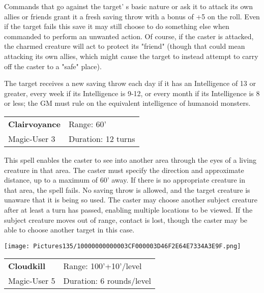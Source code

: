 \documentclass[a4paper,twoside,openany,10pt]{book}
\begin{document}
\begin{multicols}{2}
Commands that go against the target' s basic nature or ask it to attack its own allies or friends grant it a fresh saving throw with a bonus of +5 on the roll. Even if the target fails this save it may still choose to do something else when commanded to perform an unwanted action. Of course, if the caster is attacked, the charmed creature will act to protect its "friend" (though that could mean attacking its own allies, which might cause the target to instead attempt to carry off the caster to a "safe" place).

The target receives a new saving throw each day if it has an Intelligence of 13 or greater, every week if its Intelligence is 9-12, or every month if its Intelligence is 8 or less; the GM must rule on the equivalent intelligence of humanoid monsters.\medskip


\smallskip\begin{flushleft} 
	\begin{tabularx}{0.45\textwidth}{@{}m{3.5cm}m{5.5cm}@{}} 
		\textbf{Clairvoyance} & Range: 60'\\
		Magic-User 3 & Duration: 12 turns\\	
	\end{tabularx}\end{flushleft}

This spell enables the caster to see into another area through the eyes of a living creature in that area. The caster must specify the direction and approximate distance, up to a maximum of 60'{} away. If there is no appropriate creature in that area, the spell fails. No saving throw is allowed, and the target creature is unaware that it is being so used. The caster may choose another subject creature after at least a turn has passed, enabling multiple locations to be viewed. If the subject creature moves out of range, contact is lost, though the caster may be able to choose another target in this case.


\begin{flushleft}	
	\texttt{[image: Pictures135/10000000000003CF000003D46F2E64E7334A3E9F.png]}
\end{flushleft}

\smallskip\begin{flushleft} 
	\begin{tabularx}{0.45\textwidth}{@{}m{3.5cm}m{5.5cm}@{}} 
		\textbf{Cloudkill} & Range: 100'+10'/level\\
		Magic-User 5 & Duration: 6 rounds/level\\	
	\end{tabularx}\end{flushleft}


\end{multicols}
\end{document}
